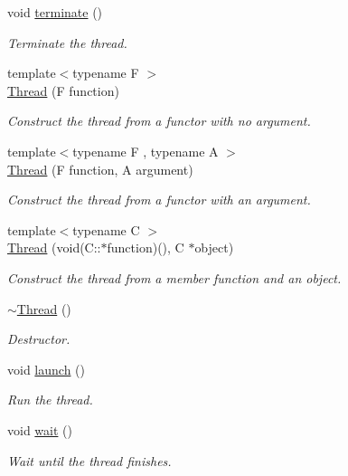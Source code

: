\begin{DoxyCompactItemize}
void \hyperlink{classsf_1_1_thread_ad6b205d4f1ce38b8d44bba0f5501477c}{terminate} ()
\begin{DoxyCompactList}\small\item\em Terminate the thread. \end{DoxyCompactList}\item 
{\footnotesize template$<$typename F $>$ }\\\hyperlink{classsf_1_1_thread_a4cc65399bbb111cf8132537783b8e96c}{Thread} (F function)
\begin{DoxyCompactList}\small\item\em Construct the thread from a functor with no argument. \end{DoxyCompactList}\item 
{\footnotesize template$<$typename F , typename A $>$ }\\\hyperlink{classsf_1_1_thread_a719b2cc067d92d52c35064a49d850a53}{Thread} (F function, A argument)
\begin{DoxyCompactList}\small\item\em Construct the thread from a functor with an argument. \end{DoxyCompactList}\item 
{\footnotesize template$<$typename C $>$ }\\\hyperlink{classsf_1_1_thread_aa9f473c8cbb078900c62b1fd14a83a34}{Thread} (void(C\-::$\ast$function)(), C $\ast$object)
\begin{DoxyCompactList}\small\item\em Construct the thread from a member function and an object. \end{DoxyCompactList}\item 
\hyperlink{classsf_1_1_thread_af77942fc1730af7c31bc4c3a913a9c1d}{$\sim$\-Thread} ()
\begin{DoxyCompactList}\small\item\em Destructor. \end{DoxyCompactList}\item 
void \hyperlink{classsf_1_1_thread_a74f75a9e86e1eb47479496314048b5f6}{launch} ()
\begin{DoxyCompactList}\small\item\em Run the thread. \end{DoxyCompactList}\item 
void \hyperlink{classsf_1_1_thread_a724b1f94c2d54f84280f2f78bde95fa0}{wait} ()
\begin{DoxyCompactList}\small\item\em Wait until the thread finishes. \end{DoxyCompactList}\item 

\end{DoxyCompactItemize}
